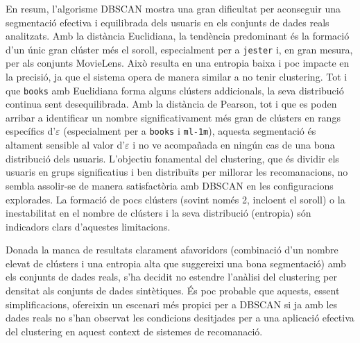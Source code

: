 \documentclass[a4paper,12pt]{report}
\begin{document}
En resum, l’algorisme DBSCAN mostra una gran dificultat per aconseguir una segmentació efectiva i equilibrada dels usuaris en els conjunts de dades reals analitzats. Amb la distància Euclidiana, la tendència predominant és la formació d’un únic gran clúster més el soroll, especialment per a \texttt{jester} i, en gran mesura, per als conjunts MovieLens. Això resulta en una entropia baixa i poc impacte en la precisió, ja que el sistema opera de manera similar a no tenir clustering. Tot i que \texttt{books} amb Euclidiana forma alguns clústers addicionals, la seva distribució continua sent desequilibrada. Amb la distància de Pearson, tot i que es poden arribar a identificar un nombre significativament més gran de clústers en rangs específics d’\(\varepsilon\) (especialment per a \texttt{books} i \texttt{ml-1m}), aquesta segmentació és altament sensible al valor d’\(\varepsilon\) i no ve acompañada en ningún cas de una bona distribució dels usuaris. L’objectiu fonamental del clustering, que és dividir els usuaris en grups significatius i ben distribuïts per millorar les recomanacions, no sembla assolir-se de manera satisfactòria amb DBSCAN en les configuracions explorades. La formació de pocs clústers (sovint només 2, incloent el soroll) o la inestabilitat en el nombre de clústers i la seva distribució (entropia) són indicadors clars d’aquestes limitacions.

Donada la manca de resultats clarament afavoridors (combinació d'un nombre elevat de clústers i una entropia alta que suggereixi una bona segmentació) amb els conjunts de dades reals, s'ha decidit no estendre l'anàlisi del clustering per densitat als conjunts de dades sintètiques. És poc probable que aquests, essent simplificacions, ofereixin un escenari més propici per a DBSCAN si ja amb les dades reals no s'han observat les condicions desitjades per a una aplicació efectiva del clustering en aquest context de sistemes de recomanació.
\end{document}
